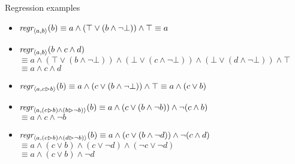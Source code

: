 \documentclass{gkibeamer}
\begin{document}
\begin{frame}{Regression examples}
  \begin{itemize}
  \item $\textit{regr}_{\langle a,b\rangle}(b)
    \equiv a \land (\top \lor (b \land \neg \bot)) \land \top
    \equiv a$
  \item $\textit{regr}_{\langle a,b\rangle}(b \land c \land d)$ \\
    $\equiv a \land (\top \lor (b \land \neg \bot)) \land (\bot \lor
    (c \land \neg \bot)) \land (\bot \lor (d \land \neg \bot)) \land
    \top$ \\
    $\equiv a \land c \land d$
  \item $\textit{regr}_{\langle a, c \vartriangleright b\rangle}(b)
    \equiv a \land (c \lor (b \land \neg \bot)) \land \top
    \equiv a \land (c \lor b)$
  \item $\textit{regr}_{\langle a,(c \vartriangleright b) \land (b \vartriangleright \neg b)\rangle}(b)
    \equiv a \land (c \lor (b \land \neg b)) \land \neg (c \land b)$ \\
    $\equiv a \land c \land \neg b$
  \item $\textit{regr}_{\langle a, (c \vartriangleright b) \land (d \vartriangleright \neg b)\rangle}(b)
    \equiv a \land (c \lor (b \land \neg d)) \land \neg (c \land d)$ \\
    $\equiv a \land (c \lor b) \land (c \lor \neg d) \land (\neg c
    \lor \neg d)$ \\
    $\equiv a \land (c \lor b) \land \neg d$
  \end{itemize}
\end{frame}
\end{document}
